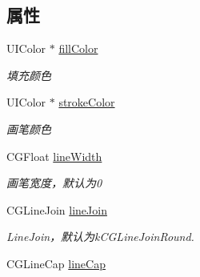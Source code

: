 \subsection*{属性}
\begin{DoxyCompactItemize}
\item 
\hypertarget{interface_b_m_k_overlay_path_view_a955c1cfe9de3338eccbde829a6651d07}{}U\+I\+Color $\ast$ \hyperlink{interface_b_m_k_overlay_path_view_a955c1cfe9de3338eccbde829a6651d07}{fill\+Color}\label{interface_b_m_k_overlay_path_view_a955c1cfe9de3338eccbde829a6651d07}

\begin{DoxyCompactList}\small\item\em 填充颜色 \end{DoxyCompactList}\item 
\hypertarget{interface_b_m_k_overlay_path_view_a5fe2c3236a16a520f9f867bd34dac08e}{}U\+I\+Color $\ast$ \hyperlink{interface_b_m_k_overlay_path_view_a5fe2c3236a16a520f9f867bd34dac08e}{stroke\+Color}\label{interface_b_m_k_overlay_path_view_a5fe2c3236a16a520f9f867bd34dac08e}

\begin{DoxyCompactList}\small\item\em 画笔颜色 \end{DoxyCompactList}\item 
\hypertarget{interface_b_m_k_overlay_path_view_a037ec8a5e6c8ee0f9b6459c8dbe280bb}{}C\+G\+Float \hyperlink{interface_b_m_k_overlay_path_view_a037ec8a5e6c8ee0f9b6459c8dbe280bb}{line\+Width}\label{interface_b_m_k_overlay_path_view_a037ec8a5e6c8ee0f9b6459c8dbe280bb}

\begin{DoxyCompactList}\small\item\em 画笔宽度，默认为0 \end{DoxyCompactList}\item 
\hypertarget{interface_b_m_k_overlay_path_view_aa57813af69de6d1852f47cdc198393fc}{}C\+G\+Line\+Join \hyperlink{interface_b_m_k_overlay_path_view_aa57813af69de6d1852f47cdc198393fc}{line\+Join}\label{interface_b_m_k_overlay_path_view_aa57813af69de6d1852f47cdc198393fc}

\begin{DoxyCompactList}\small\item\em Line\+Join，默认为k\+C\+G\+Line\+Join\+Round. \end{DoxyCompactList}\item 
\hypertarget{interface_b_m_k_overlay_path_view_a3b52405ce16992ffd75e98cf7f8392a1}{}C\+G\+Line\+Cap \hyperlink{interface_b_m_k_overlay_path_view_a3b52405ce16992ffd75e98cf7f8392a1}{line\+Cap}\label{interface_b_m_k_overlay_path_view_a3b52405ce16992ffd75e98cf7f8392a1}


\end{DoxyCompactItemize}
